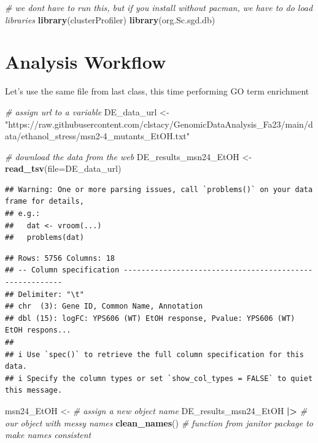 \documentclass[
]{book}
\newenvironment{Shaded}{\begin{snugshade}}{\end{snugshade}}
\newcommand{\AttributeTok}[1]{\textcolor[rgb]{0.13,0.29,0.53}{#1}}
\newcommand{\CommentTok}[1]{\textcolor[rgb]{0.56,0.35,0.01}{\textit{#1}}}
\newcommand{\FunctionTok}[1]{\textcolor[rgb]{0.13,0.29,0.53}{\textbf{#1}}}
\newcommand{\NormalTok}[1]{#1}
\newcommand{\OtherTok}[1]{\textcolor[rgb]{0.56,0.35,0.01}{#1}}
\newcommand{\SpecialCharTok}[1]{\textcolor[rgb]{0.81,0.36,0.00}{\textbf{#1}}}
\newcommand{\StringTok}[1]{\textcolor[rgb]{0.31,0.60,0.02}{#1}}
\begin{document}
\begin{Shaded}
\begin{Highlighting}[]
\CommentTok{\# we don\textquotesingle{}t have to run this, but if you install without pacman, we have to do load libraries}
\FunctionTok{library}\NormalTok{(clusterProfiler)}
\FunctionTok{library}\NormalTok{(org.Sc.sgd.db)}
\end{Highlighting}
\end{Shaded}

\hypertarget{analysis-workflow}{%
\section{Analysis Workflow}\label{analysis-workflow}}

Let's use the same file from last class, this time performing GO term enrichment

\begin{Shaded}
\begin{Highlighting}[]
\CommentTok{\# assign url to a variable}
\NormalTok{DE\_data\_url }\OtherTok{\textless{}{-}} \StringTok{"https://raw.githubusercontent.com/clstacy/GenomicDataAnalysis\_Fa23/main/data/ethanol\_stress/msn2{-}4\_mutants\_EtOH.txt"}

\CommentTok{\# download the data from the web}
\NormalTok{DE\_results\_msn24\_EtOH }\OtherTok{\textless{}{-}}
  \FunctionTok{read\_tsv}\NormalTok{(}\AttributeTok{file=}\NormalTok{DE\_data\_url)}
\end{Highlighting}
\end{Shaded}

\begin{verbatim}
## Warning: One or more parsing issues, call `problems()` on your data frame for details,
## e.g.:
##   dat <- vroom(...)
##   problems(dat)
\end{verbatim}

\begin{verbatim}
## Rows: 5756 Columns: 18
## -- Column specification --------------------------------------------------------
## Delimiter: "\t"
## chr  (3): Gene ID, Common Name, Annotation
## dbl (15): logFC: YPS606 (WT) EtOH response, Pvalue: YPS606 (WT) EtOH respons...
## 
## i Use `spec()` to retrieve the full column specification for this data.
## i Specify the column types or set `show_col_types = FALSE` to quiet this message.
\end{verbatim}

\begin{Shaded}
\begin{Highlighting}[]
\NormalTok{msn24\_EtOH }\OtherTok{\textless{}{-}} \CommentTok{\# assign a new object name}
\NormalTok{  DE\_results\_msn24\_EtOH }\SpecialCharTok{|\textgreater{}} \CommentTok{\# our object with messy names}
  \FunctionTok{clean\_names}\NormalTok{() }\CommentTok{\# function from janitor package to make names consistent}
\end{Highlighting}
\end{Shaded}
\end{document}
